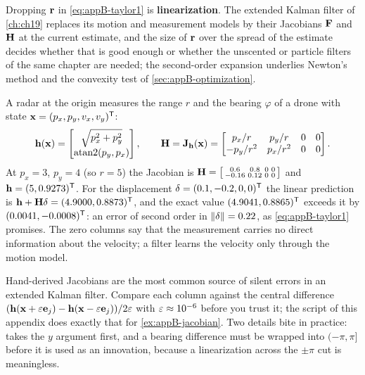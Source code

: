 Dropping $\mathbf{r}$ in \cref{eq:appB-taylor1} is
\textbf{linearization}. The extended Kalman filter of
\cref{ch:ch19} replaces its motion and measurement models by their Jacobians
$\mathbf{F}$ and $\mathbf{H}$ at the current estimate, and the size of $\mathbf{r}$
over the spread of the estimate decides whether that is good enough or whether
the unscented or particle filters of the same chapter are needed; the
second-order expansion underlies Newton's method and the convexity test of
\cref{sec:appB-optimization}.

\begin{example}
\label{ex:appB-jacobian}
A radar at the origin measures the range $r$ and the bearing $\varphi$ of a drone with state $\mathbf{x} = (p_x, p_y, v_x, v_y)^{\mathsf{T}}$:
\begin{equation*}
  \mathbf{h}(\mathbf{x}) = \begin{bmatrix} \sqrt{p_x^2 + p_y^2}\\ \operatorname{atan2}(p_y, p_x)\end{bmatrix},\qquad
  \mathbf{H} = \mathbf{J}_{\mathbf{h}}(\mathbf{x}) = \begin{bmatrix} p_x/r & p_y/r & 0 & 0\\ -p_y/r^2 & p_x/r^2 & 0 & 0\end{bmatrix}.
\end{equation*}
At $p_x = 3$, $p_y = 4$ (so $r = 5$) the Jacobian is $\mathbf{H} = \begin{bsmallmatrix} 0.6 & 0.8 & 0 & 0\\ -0.16 & 0.12 & 0 & 0\end{bsmallmatrix}$ and $\mathbf{h} = (5, 0.9273)^{\mathsf{T}}$. For the displacement $\mathbf{\delta} = (0.1, -0.2, 0, 0)^{\mathsf{T}}$ the linear prediction is $\mathbf{h} + \mathbf{H}\mathbf{\delta} = (4.9000, 0.8873)^{\mathsf{T}}$, and the exact value $(4.9041, 0.8865)^{\mathsf{T}}$ exceeds it by $(0.0041, -0.0008)^{\mathsf{T}}$: an error of second order in $\left\lVert \mathbf{\delta} \right\rVert = 0.22$, as \cref{eq:appB-taylor1} promises. The zero columns say that the measurement carries no direct information about the velocity; a filter learns the velocity only through the motion model.
\end{example}

\begin{pitfall}
Hand-derived Jacobians are the most common source of silent errors in an extended Kalman filter. Compare each column against the central difference $(\mathbf{h}(\mathbf{x} + \varepsilon\mathbf{e}_j) - \mathbf{h}(\mathbf{x} - \varepsilon\mathbf{e}_j))/2\varepsilon$ with $\varepsilon \approx 10^{-6}$ before you trust it; the script of this appendix does exactly that for \cref{ex:appB-jacobian}. Two details bite in practice:  takes the $y$ argument first, and a bearing difference must be wrapped into $(-\pi, \pi]$ before it is used as an innovation, because a linearization across the $\pm\pi$ cut is meaningless.
\end{pitfall}

